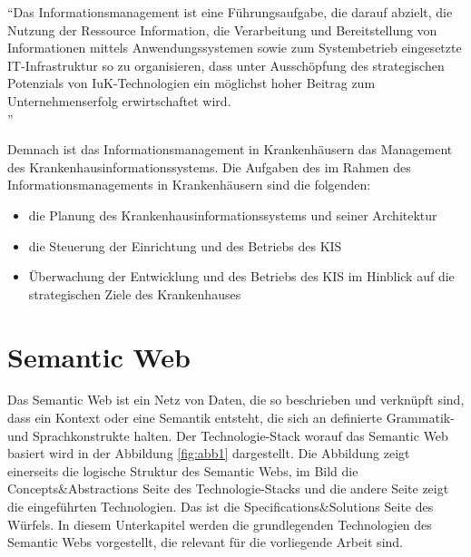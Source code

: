 \begin{addmargin}[10pt]{10pt}
\enquote{Das Informationsmanagement ist eine Führungsaufgabe, die darauf abzielt, die Nutzung der Ressource Information, die Verarbeitung und Bereitstellung von Informationen
mittels Anwendungssystemen sowie zum Systembetrieb eingesetzte IT-Infrastruktur so zu
organisieren, dass unter Ausschöpfung des strategischen Potenzials von IuK-Technologien
ein möglichst hoher Beitrag zum Unternehmenserfolg erwirtschaftet wird. \\ }
\end{addmargin} 

Demnach ist das Informationsmanagement in Krankenhäusern das Management des Krankenhausinformationssystems.
Die Aufgaben des im Rahmen des Informationsmanagements in Krankenhäusern sind die folgenden:

\begin{itemize}
\item die Planung des Krankenhausinformationssystems und seiner Architektur
\item die Steuerung der Einrichtung und des Betriebs des \ac{KIS}
\item Überwachung der Entwicklung und des Betriebs des \ac{KIS} im Hinblick auf die strategischen Ziele des Krankenhauses \citep[vgl.]{winter_health_2011}
\end{itemize}

\section{Semantic Web}\label{sec:sw}

Das Semantic Web ist ein Netz von Daten, die so beschrieben und verknüpft sind, dass ein Kontext oder eine Semantik entsteht, die sich an definierte Grammatik- und Sprachkonstrukte halten. \citep[vgl.]{hebeler_semantic_2009}
Der Technologie-Stack worauf das Semantic Web basiert wird in der Abbildung \ref{fig:abb1} dargestellt.
Die Abbildung zeigt einerseits die logische Struktur des Semantic Webs, im Bild die Concepts\&Abstractions Seite des Technologie-Stacks und die andere Seite zeigt die eingeführten Technologien.
Das ist die Specifications\&Solutions Seite des Würfels.
In diesem Unterkapitel werden die grundlegenden Technologien des Semantic Webs vorgestellt, die relevant für die vorliegende Arbeit sind.

